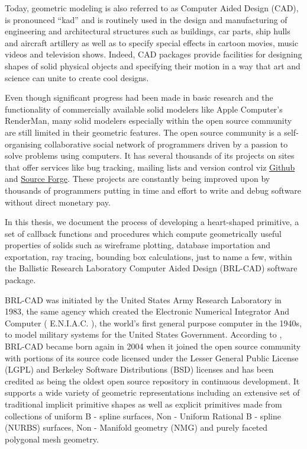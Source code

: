 \hspace{30}Today, geometric modeling is also referred to as Computer ­Aided Design
(CAD), is pronounced “kad” and is routinely used in the design and
manufacturing of engineering and architectural structures such as buildings, car  
parts, ship hulls and aircraft artillery as well as to specify special effects in  
cartoon movies, music videos and television shows. Indeed, CAD packages
provide facilities for designing shapes of solid physical objects and specifying
their motion in a way that art and science can unite to create cool designs.  

\hspace{30} Even though significant progress had been made in basic research and
the functionality of commercially available solid modelers like Apple
Computer's RenderMan, many solid modelers especially within the open
source community are still limited in their geometric features. The open
source community is a self­ organising collaborative social network of 
programmers driven by a passion to solve problems using computers.
It has several thousands of its projects on sites that offer services 
like bug tracking, mailing lists and version control viz \href{https://github.com/}{Github} 
and \href{http://sourceforge.net}{Source Forge}. These projects are constantly 
being improved upon by thousands of programmers putting in time and effort 
to write and debug software without direct monetary pay.

\hspace{30} In this thesis, we document the process of developing a heart­-shaped
primitive, a set of callback functions and procedures which compute geometrically 
useful properties of solids such as wireframe plotting, database importation and 
exportation, ray tracing, bounding box calculations, just to name a few, within the
 Ballistic Research Laboratory Computer Aided Design (BRL-­CAD) software package.  

\hspace{30} BRL-­CAD was initiated by the United States Army Research Laboratory
in 1983, the same agency which created the Electronic Numerical Integrator And 
Computer ( E.N.I.A.C. ), the world's first 
general ­purpose computer in the 1940s, to model military systems for the
United States Government. According to \cite{3}, BRL-­CAD became born again in 
2004 when it joined the open source community with portions of its source
code licensed under the Lesser General Public License (LGPL) and Berkeley
Software Distributions (BSD) licenses and has been credited as being the
oldest open source repository in continuous development. It supports a wide
variety of geometric representations including an extensive set of traditional
implicit primitive shapes as well as explicit primitives made from collections of
uniform B - ­spline surfaces, Non - ­Uniform Rational B - ­spline (NURBS) surfaces,  
Non­ - Manifold geometry (NMG) and purely faceted polygonal mesh geometry.  

